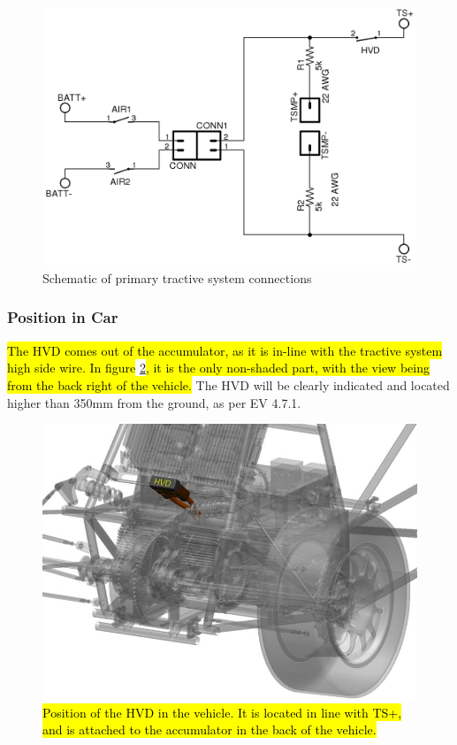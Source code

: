 \documentclass{article}
\DeclareRobustCommand{\hlr}[1]{{\sethlcolor{red}\hl{#1}}}
\begin{document}
            \begin{figure}[H]
                \centering
                \includegraphics[width = 0.75 \textwidth]{HVD}
                \caption{Schematic of primary tractive system connections}
                \label{HVDschem}
            \end{figure}

        \subsubsection{Position in Car}

            \hlr{The HVD comes out of the accumulator, as it is in-line with the tractive system high side wire. In figure} \ref{hvdlocation}\hlr{, it is the only non-shaded part, with the view being from the back right of the vehicle.} The HVD will be clearly indicated and located higher than 350mm from the ground, as per EV 4.7.1.          
        

        \begin{figure}[H]
            \centering
            \includegraphics[width = 0.6 \textwidth]{hvd_position}
            \caption{\hlr{Position of the HVD in the vehicle. It is located in line with TS+, and is attached to the accumulator in the back of the vehicle. }}
            \label{hvdlocation}
        \end{figure}
        
\end{document}
